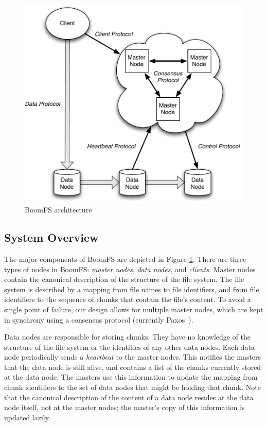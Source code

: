 \documentclass[twocolumn]{article}
\begin{document}
\begin{figure}
\centering
\includegraphics[width=1\columnwidth]{figures/boomfs_arch.pdf}
\caption{BoomFS architecture}
\label{fig:system-arch}
\end{figure}

\subsection{System Overview}
The major components of BoomFS are depicted in Figure
\ref{fig:system-arch}. There are three types of nodes in BoomFS:
\emph{master nodes}, \emph{data nodes}, and \emph{clients}. Master
nodes contain the canonical description of the structure of the
file system. The file system is described by a mapping from file names
to file identifiers, and from file identifiers to the sequence of
chunks that contain the file's content. To avoid a single point of
failure, our design allows for multiple master nodes, which are kept
in synchrony using a consensus protocol (currently
Paxos~\cite{paxos-made-simple}).

Data nodes are responsible for storing chunks. They have no knowledge
of the structure of the file system or the identities of any other
data nodes. Each data node periodically sends a \emph{heartbeat} to
the master nodes. This notifies the masters that the data node is
still alive, and contains a list of the chunks currently stored at the
data node. The masters use this information to update the mapping from
chunk identifiers to the set of data nodes that might be holding that
chunk. Note that the canonical description of the content of a data
node resides at the data node itself, not at the master nodes; the
master's copy of this information is updated lazily.
\end{document}
